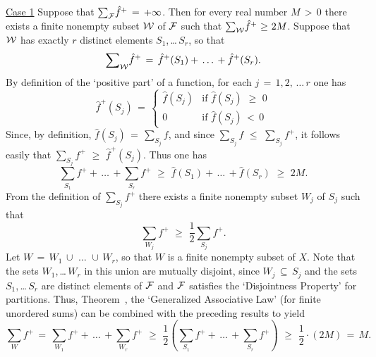         \underline{Case 1} Suppose that ${\sum}_{{\cal F}} \hat{f}^{+} \,=\, +{\infty}$.
    Then for every real number $M\,>\,0$ there exists a finite nonempty subset ${\cal W}$ of ${\cal F}$ such that ${\sum}_{{\cal W}} \hat{f}^{+}\,\,{\geq}\,\,2M$.
    Suppose that ${\cal W}$ has exactly $r$ distinct elements $S_{1}$,\,{\ldots}\,$S_{r}$, so that
        \begin{displaymath}
        {\sum}_{{\cal W}} \hat{f}^{+} \,=\, \hat{f}^{+}(S_{1}) + \,{\ldots}\,+\hat{f}^{+}(S_{r}).
        \end{displaymath}
    By definition of the `positive part' of a function, for each $j \,=\, 1,2,\,{\ldots}\,r$ one has
        \begin{displaymath}
        \hat{f}^{+}(S_{j}) \,=\, \left\{
        \begin{array}{cl}
        \hat{f}(S_{j}) & \mbox{if $\hat{f}(S_{j})\,\,{\geq}\,\,0$} \\
            0          & \mbox{if $\hat{f}(S_{j})\,<\,0$}
        \end{array}
                                            \right.
        \end{displaymath}
    Since, by definition, $\hat{f}(S_{j}) \,=\, {\sum}_{S_{j}} f$, and since $ {\sum}_{S_{j}} f\,\,{\leq}\,\,{\sum}_{S_{j}} f^{+}$,
    it follows easily that $\sum_{S_{j}} f^{+}\,\,{\geq}\,\,\hat{f}^{+}(S_{j})$.
    Thus one has
        \begin{displaymath}
        {\sum}_{S_{1}} f^{+} + \,{\ldots}\,+ {\sum}_{S_{r}} f^{+}\,\,{\geq}\,\,
    \hat{f}(S_{1}) + \,{\ldots}\, + \hat{f}(S_{r}) \,\,{\geq}\,\,2M.
        \end{displaymath}
    From the definition of ${\sum}_{S_{j}} f^{+}$ there exists a finite nonempty subset $W_{j}$ of $S_{j}$ such that
        \begin{displaymath}
        {\sum}_{W_{j}} f^{+}\,\,{\geq}\,\,\frac{1}{2}{\sum}_{S_{j}} f^{+}.
        \end{displaymath}
    Let $W \,=\, W_{1}\,{\cup}\,\,{\ldots}\,\,{\cup}\,W_{r}$, so that $W$ is a finite nonempty subset of $X$.
    Note that the sets $W_{1}$,\,{\ldots}\,$W_{r}$ in this union are mutually disjoint, since $W_{j} \,{\subseteq}\, S_{j}$ and the sets $S_{1}$,\,{\ldots}\,$S_{r}$ are distinct elements of ${\cal F}$ and ${\cal F}$ satisfies the `Disjointness Property' for partitions.
    Thus, Theorem~, the `Generalized Associative Law' (for finite unordered sums) can be combined with the preceding results to yield
        \begin{displaymath}
        {\sum}_{W} f^{+} \,=\, {\sum}_{W_{1}} f^{+} + \,{\ldots}\,+ {\sum}_{W_{r}} f^{+}
        \,\,{\geq}\,\,\frac{1}{2}\left({\sum}_{S_{1}} f^{+} + \,{\ldots}\,+ {\sum}_{S_{r}} f^{+}\right)\,\,{\geq}\,\,\frac{1}{2}{\cdot}(2M) \,=\, M.
        \end{displaymath}

